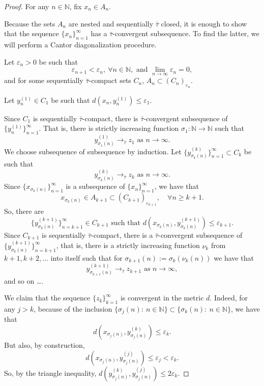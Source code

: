 \documentclass[10pt,a4paper]{amsart}
\def\N{\mathbb{N}}
\begin{document}
\begin{proof}
    For any $n\in \N$, fix
    $
        x_n \in A_n $.

    Because the sets $A_n$ are nested and sequentially $\bar\tau$  closed, it is enough to show that the sequence $\{x_n\}_{n=1}^\infty$ has a $\bar\tau$-convergent subsequence. To find the latter, we will perform a Cantor diagonalization procedure.

    Let $\varepsilon_n > 0$ be such that
    $$
        \varepsilon_{n+1} < \varepsilon_n,\ \forall n\in\mathbb{N},\text{ and }\lim_{n\to\infty} \varepsilon_n = 0,
    $$
    and for some sequentially $\bar\tau$-compact sets $C_n$, $
        A_n \subset (C_n)_{\varepsilon_n}$.

    Let
    $
        y_n^{(1)} \in C_1$ be such that $d(x_n,y_n^{(1)}) \le \varepsilon_1$.

    Since $C_1$ is sequentially $\bar\tau$-compact, there is $\bar\tau$-convergent subsequence of $\{y_n^{(1)}\}_{n=1}^\infty$. That is, there is strictly increasing function $\sigma_1:\mathbb{N}\to\mathbb{N}$ such that
    $$
         y_{\sigma_1(n)}^{(1)} \to_{\bar\tau} z_1\text{ as } n\to \infty.
    $$
    We choose subsequence of subsequence by induction. Let $\{y_{\sigma_k(n)}^{(k)}\}_{n=1}^\infty\subset C_k$ be such that
    $$
         y_{\sigma_k(n)}^{(k)}\to_{\bar\tau} z_k \text{ as } n\to \infty.
    $$
    Since $\{x_{\sigma_k(n)}\}_{n=1}^\infty$ is a subsequence of $\{x_n\}_{n=1}^\infty$, we have that
    $$
        x_{\sigma_k(n)} \in A_{k+1} \subset (C_{k+1})_{\varepsilon_{k+1}},\quad\forall n \ge k + 1.
    $$
    So, there are
    $$
        \{y_{\sigma_k(n)}^{(k+1)}\}_{n=k+1}^\infty \in C_{k+1}\text{ such that }d(x_{\sigma_k(n)},y_{\sigma_k(n)}^{(k+1)}) \le \varepsilon_{k+1}.
    $$
    Since $C_{k+1}$ is sequentially $\bar\tau$-compact, there is a $\bar\tau$-convergent subsequence of $\{y_{\sigma_k(n)}^{(k+1)}\}_{n=k+1}^\infty$, that is, there is a strictly increasing function $\nu_k$ from $k+1,k+2,\ldots$ into itself such that for
    $
        \sigma_{k+1}(n) := \sigma_k(\nu_k(n))$
    we have that
    $$
         y_{\sigma_{k+1}(n)}^{(k+1)} \to_{\bar\tau} z_{k+1}\text{ as } n\to \infty,
    $$
    and so on \ldots.

    We claim that the sequence $\{z_k\}_{k=1}^\infty$ is  convergent in the metric $d$. Indeed, for any $j>k$, because of the inclusion $\{\sigma_j(n):\ n\in\N\} \subset \{\sigma_k(n):\ n\in\N\}$, we have that
    $$
        d(x_{\sigma_j(n)},y_{\sigma_j(n)}^{(k)}) \le \varepsilon_k.
    $$
    But also, by construction,
    $$
        d(x_{\sigma_j(n)},y_{\sigma_j(n)}^{(j)}) \le \varepsilon_j < \varepsilon_k.
    $$
    So, by the triangle inequality, $d(y_{\sigma_j(n)}^{(k)},y_{\sigma_j(n)}^{(j)}) \le 2 \varepsilon_k$.


\end{proof}
\end{document}
